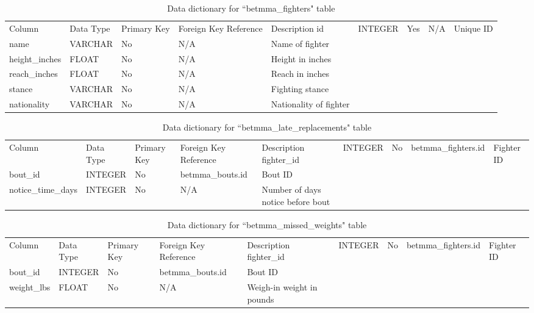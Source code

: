 \documentclass[12pt,twoside]{report}
\begin{document}
\newpage
\tiny
\begin{longtable}{lllll}
\caption{Data dictionary for ``betmma\_fighters" table}\\ 
\toprule
Column         & Data Type & Primary Key & Foreign Key Reference & Description             \endfirsthead 
\toprule
id             & INTEGER   & Yes         & N/A                   & Unique ID               \\
name           & VARCHAR   & No          & N/A                   & Name of fighter         \\
height\_inches & FLOAT     & No          & N/A                   & Height in inches        \\
reach\_inches  & FLOAT     & No          & N/A                   & Reach in inches         \\
stance         & VARCHAR   & No          & N/A                   & Fighting stance         \\
nationality    & VARCHAR   & No          & N/A                   & Nationality of fighter  \\
\bottomrule
\end{longtable}
\normalsize

\tiny
\begin{longtable}{lllll}
\caption{Data dictionary for ``betmma\_late\_replacements" table}\\ 
\toprule
Column             & Data Type & Primary Key & Foreign Key Reference & Description                        \endfirsthead 
\toprule
fighter\_id        & INTEGER   & No          & betmma\_fighters.id   & Fighter ID                         \\
bout\_id           & INTEGER   & No          & betmma\_bouts.id      & Bout ID                            \\
notice\_time\_days & INTEGER   & No          & N/A                   & Number of days notice before bout  \\
\bottomrule
\end{longtable}
\normalsize

\tiny 
\begin{longtable}{lllll}
\caption{Data dictionary for ``betmma\_missed\_weights" table}\\ 
\toprule
Column      & Data Type & Primary Key & Foreign Key Reference & Description                \endfirsthead 
\toprule
fighter\_id & INTEGER   & No          & betmma\_fighters.id   & Fighter ID                 \\
bout\_id    & INTEGER   & No          & betmma\_bouts.id      & Bout ID                    \\
weight\_lbs & FLOAT     & No          & N/A                   & Weigh-in weight in pounds  \\
\bottomrule
\end{longtable}
\normalsize
\end{document}
